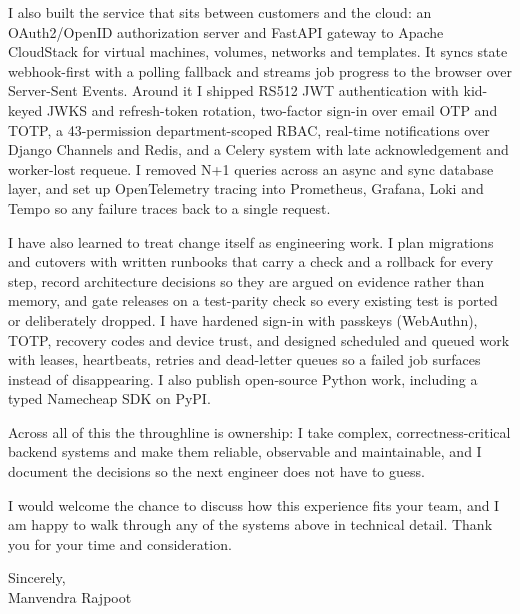 \documentclass[11pt,a4paper]{article}
\begin{document}
I also built the service that sits between customers and the cloud: an OAuth2/OpenID
authorization server and FastAPI gateway to Apache CloudStack for virtual machines,
volumes, networks and templates. It syncs state webhook-first with a polling fallback
and streams job progress to the browser over Server-Sent Events. Around it I shipped RS512
JWT authentication with kid-keyed JWKS and refresh-token rotation, two-factor sign-in over
email OTP and TOTP, a 43-permission department-scoped RBAC, real-time notifications over
Django Channels and Redis, and a Celery system with late acknowledgement and worker-lost
requeue. I removed N+1 queries across an async and sync database layer, and set up
OpenTelemetry tracing into Prometheus, Grafana, Loki and Tempo so any failure traces back
to a single request.

I have also learned to treat change itself as engineering work. I plan migrations
and cutovers with written runbooks that carry a check and a rollback for every step,
record architecture decisions so they are argued on evidence rather than memory, and gate
releases on a test-parity check so every existing test is ported or deliberately
dropped. I have hardened sign-in with passkeys (WebAuthn), TOTP, recovery codes and device
trust, and designed scheduled and queued work with leases, heartbeats, retries and
dead-letter queues so a failed job surfaces instead of disappearing. I also publish
open-source Python work, including a typed Namecheap SDK on PyPI.

Across all of this the throughline is ownership: I take complex,
correctness-critical backend systems and make them reliable, observable and
maintainable, and I document the decisions so the next engineer does not have to guess.

I would welcome the chance to discuss how this experience fits your team, and I am
happy to walk through any of the systems above in technical detail. Thank you for your
time and consideration.


Sincerely,\\[6pt]
Manvendra Rajpoot
\end{document}

